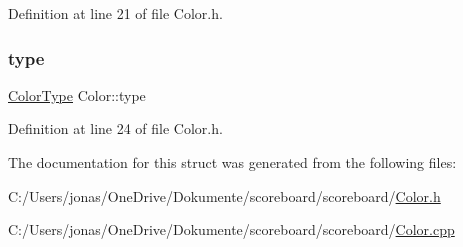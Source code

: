 Definition at line 21 of file Color.\+h.

\mbox{\label{struct_color_a3e03553ecdc4f69087d3d0e9103d0b87}} 
\subsubsection{\texorpdfstring{type}{type}}
{\footnotesize\ttfamily \hyperlink{struct_color_a9216c50419c87f87e2de51ce5bd73be9}{Color\+Type} Color\+::type}



Definition at line 24 of file Color.\+h.



The documentation for this struct was generated from the following files\+:\begin{DoxyCompactItemize}
\item 
C\+:/\+Users/jonas/\+One\+Drive/\+Dokumente/scoreboard/scoreboard/\hyperlink{_color_8h}{Color.\+h}\item 
C\+:/\+Users/jonas/\+One\+Drive/\+Dokumente/scoreboard/scoreboard/\hyperlink{_color_8cpp}{Color.\+cpp}\end{DoxyCompactItemize}
